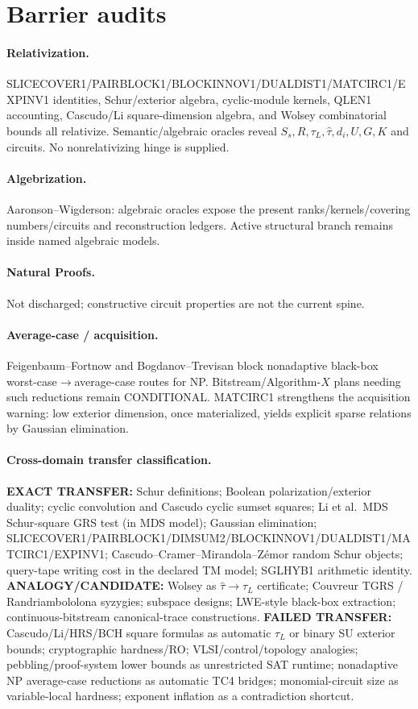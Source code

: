 \documentclass[11pt]{article}
\begin{document}
\section*{Barrier audits}
\paragraph{Relativization.}
SLICECOVER1/PAIRBLOCK1/BLOCKINNOV1/DUALDIST1/MATCIRC1/EXPINV1 identities, Schur/exterior algebra,
cyclic-module kernels, QLEN1 accounting, Cascudo/Li square-dimension algebra, and Wolsey
combinatorial bounds all relativize. Semantic/algebraic oracles reveal
$S_s,R,\tau_L,\widehat\tau,d_i,U,G,K$ and circuits. No nonrelativizing hinge is supplied.
\paragraph{Algebrization.}
Aaronson--Wigderson: algebraic oracles expose the present ranks/kernels/covering numbers/circuits
and reconstruction ledgers. Active structural branch remains inside named algebraic models.
\paragraph{Natural Proofs.}
Not discharged; constructive circuit properties are not the current spine.
\paragraph{Average-case / acquisition.}
Feigenbaum--Fortnow and Bogdanov--Trevisan block nonadaptive black-box worst-case$\to$average-case
routes for NP. Bitstream/Algorithm-$X$ plans needing such reductions remain CONDITIONAL.
MATCIRC1 strengthens the acquisition warning: low exterior dimension, once materialized, yields
explicit sparse relations by Gaussian elimination.
\paragraph{Cross-domain transfer classification.}
\textbf{EXACT TRANSFER:} Schur definitions; Boolean polarization/exterior duality; cyclic convolution
and Cascudo cyclic sumset squares; Li et al.\ MDS Schur-square GRS test (in MDS model);
Gaussian elimination; SLICECOVER1/PAIRBLOCK1/DIMSUM2/BLOCKINNOV1/DUALDIST1/MATCIRC1/EXPINV1;
Cascudo--Cramer--Mirandola--Z\'emor random Schur objects; query-tape writing cost in the declared
TM model; SGLHYB1 arithmetic identity.
\textbf{ANALOGY/CANDIDATE:} Wolsey as $\widehat\tau\to\tau_L$ certificate; Couvreur TGRS /
Randriambololona syzygies; subspace designs; LWE-style black-box extraction;
continuous-bitstream canonical-trace constructions.
\textbf{FAILED TRANSFER:} Cascudo/Li/HRS/BCH square formulas as automatic $\tau_L$ or binary SU
exterior bounds; cryptographic hardness/RO; VLSI/control/topology analogies;
pebbling/proof-system lower bounds as unrestricted SAT runtime; nonadaptive NP average-case
reductions as automatic TC4 bridges; monomial-circuit size as variable-local hardness;
exponent inflation as a contradiction shortcut.
\end{document}
